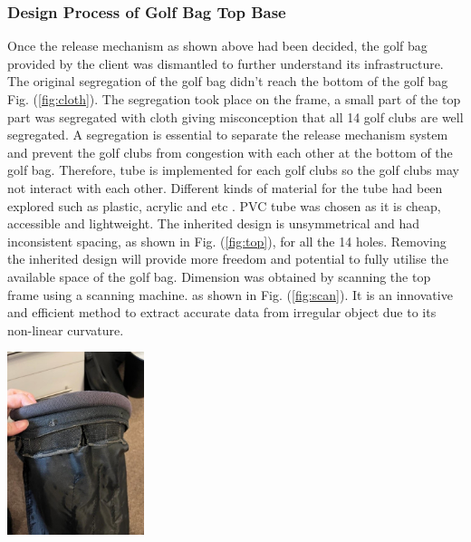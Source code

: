 \documentclass[11pt,landscape]{article}
\newenvironment{Figure}
  {\par\medskip\noindent\minipage{\linewidth}}
  {\endminipage\par\medskip}
\begin{document}
\begin{multicols}{3}
\subsubsection{Design Process of Golf Bag Top Base }
Once the release mechanism as shown above had been
    decided, the golf bag provided by the client was dismantled to further
    understand its infrastructure. The original 
    segregation of the golf bag didn't reach the bottom of the golf bag Fig.
    (\ref{fig:cloth}). The segregation took place on the frame, a small part of
    the top part was segregated with cloth giving misconception that all  14
    golf clubs are well segregated. A segregation is
    essential to separate the release mechanism system and prevent the golf
    clubs from congestion with each other at the bottom of the golf bag. Therefore,    tube is implemented for each golf clubs so the golf clubs may not interact
    with each other. Different kinds of material for the tube had been explored such as plastic, acrylic and etc . PVC
    tube was chosen as it is cheap, accessible and lightweight. 
The inherited design is unsymmetrical and had
    inconsistent spacing, as shown in Fig. (\ref{fig:top}), for all the 14
    holes. Removing the inherited design will provide more freedom and
    potential to fully utilise the available space of the golf bag. Dimension was obtained by
scanning the top frame using a scanning machine. as shown in
     Fig. (\ref{fig:scan}). It is an innovative and efficient method to
    extract accurate data from irregular object due to its non-linear curvature.
    
    \begin{Figure}
        \begin{center}
            \includegraphics[width=0.3\textwidth]{Figure3.jpg}
            \label{fig:cloth}
        \end{center}
    \end{Figure}
    

\end{multicols}
\end{document}
